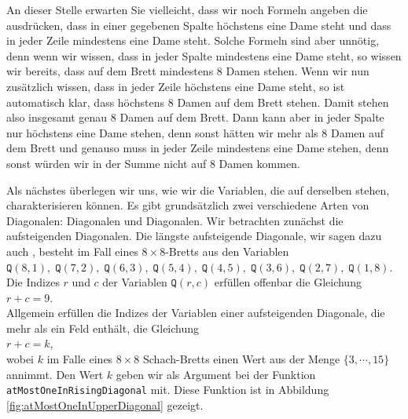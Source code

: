An dieser Stelle erwarten Sie vielleicht, dass wir noch Formeln angeben die
ausdrücken, dass in einer gegebenen Spalte höchstens eine Dame steht und dass in jeder
Zeile mindestens eine Dame steht.
Solche Formeln sind aber unnötig, denn wenn wir wissen, dass in jeder Spalte mindestens
eine Dame steht, so wissen wir bereits, dass auf dem Brett mindestens 8 Damen stehen.
Wenn wir nun zusätzlich wissen, dass in jeder Zeile höchstens eine Dame steht, so ist
automatisch klar, dass höchstens 8 Damen auf dem Brett stehen.  Damit stehen also insgesamt genau
8 Damen auf dem Brett.  Dann kann aber in jeder Spalte nur höchstens eine Dame stehen, denn sonst hätten wir
mehr als 8 Damen auf dem Brett und genauso muss in jeder Zeile mindestens eine Dame stehen, denn sonst würden
wir in der Summe nicht auf 8 Damen kommen. 

Als nächstes überlegen wir uns, wie wir die Variablen, die auf derselben 
stehen, charakterisieren können.  Es gibt grundsätzlich zwei verschiedene Arten von
Diagonalen:  Diagonalen und  Diagonalen.  Wir betrachten zunächst
die aufsteigenden Diagonalen.  Die längste aufsteigende Diagonale, wir sagen dazu auch
, besteht im Fall eines $8 \times 8$-Bretts aus den
Variablen \\[0.2cm]
\hspace*{1.3cm} 
$\texttt{Q}(8,1),\; \texttt{Q}(7,2),\; \texttt{Q}(6,3),\; \texttt{Q}(5,4),\; \texttt{Q}(4,5),\; \texttt{Q}(3,6),\; 
 \texttt{Q}(2,7),\; \texttt{Q}(1,8)$. 
\\[0.2cm]
Die Indizes $r$ und $c$ der Variablen $\texttt{Q}(r,c)$ erfüllen offenbar
die Gleichung \\[0.2cm]
\hspace*{1.3cm} $r + c = 9$. \\[0.2cm]
Allgemein erfüllen die Indizes der Variablen einer aufsteigenden Diagonale, die mehr als ein Feld enthält, die
Gleichung \\[0.2cm] 
\hspace*{1.3cm} $r + c = k$, \\[0.2cm]
wobei $k$ im Falle eines $8 \times 8$ Schach-Bretts einen Wert aus der Menge $\{3, \cdots, 15 \}$ annimmt.  Den Wert $k$ geben wir als Argument bei der
Funktion \texttt{atMostOneInRisingDiagonal} mit.  Diese Funktion ist in Abbildung
\ref{fig:atMostOneInUpperDiagonal} gezeigt. 

